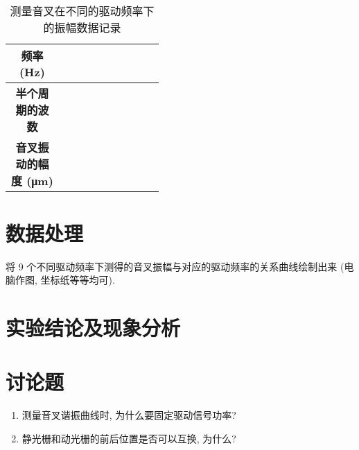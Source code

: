\documentclass[signature=data]{physicsreport}
\begin{document}
\subsection{}
\vspace*{-1.5em}
\begin{table}[H]
    \caption{测量音叉在不同的驱动频率下的振幅数据记录}
    \vspace*{1em}
    \centering
    \begin{tabularx}{\textwidth}{|>{\bfseries}c|*{9}{X|}} \hline
        \makecell{频率  \\(Hz)}                       &  &  &  &  &  &  &  &  & \\ \hline
        \makecell{半个周 \\期的波\\数}                       &  &  &  &  &  &  &  &  & \\ \hline
        \makecell{音叉振 \\动的幅\\度 (\unit{\micro\meter})} &  &  &  &  &  &  &  &  & \\ \hline
    \end{tabularx}
\end{table}

\makeatletter
{}
\makeatother

\newpage
\section{数据处理}
将 9 个不同驱动频率下测得的音叉振幅与对应的驱动频率的关系曲线绘制出来 (电脑作图, 坐标纸等等均可).

\vspace*{20em}
\section{实验结论及现象分析}

\vspace*{5cm}
\section{讨论题}
\begin{enumerate}
    \item 测量音叉谐振曲线时, 为什么要固定驱动信号功率?
    \item 静光栅和动光栅的前后位置是否可以互换, 为什么?
\end{enumerate}
\end{document}
